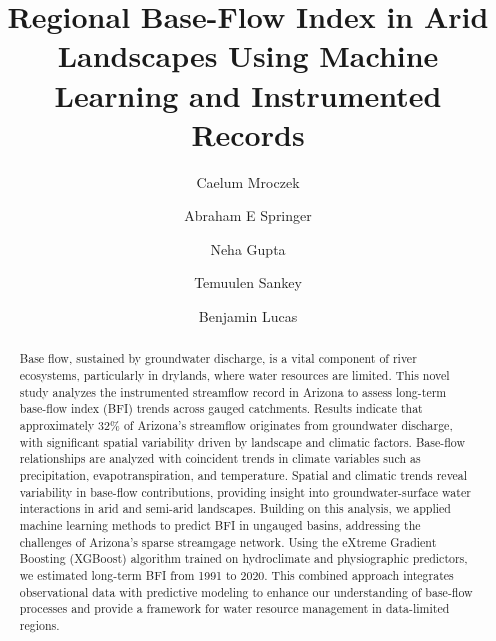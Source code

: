 \documentclass[
  authoryear,
  preprint,
  1p,
  onecolumn]{elsarticle}
\begin{document}
\begin{frontmatter}
\title{Regional Base-Flow Index in Arid Landscapes Using Machine
Learning and Instrumented Records}
\author[1]{Caelum Mroczek%
%
}
\author[1]{Abraham E Springer%
%
}

\author[2]{Neha Gupta%
%
}

\author[3]{Temuulen Sankey%
%
}

\author[4]{Benjamin Lucas%
%
}








        
\begin{abstract}
Base flow, sustained by groundwater discharge, is a vital component of
river ecosystems, particularly in drylands, where water resources are
limited. This novel study analyzes the instrumented streamflow record in
Arizona to assess long-term base-flow index (BFI) trends across gauged
catchments. Results indicate that approximately 32\% of Arizona's
streamflow originates from groundwater discharge, with significant
spatial variability driven by landscape and climatic factors. Base-flow
relationships are analyzed with coincident trends in climate variables
such as precipitation, evapotranspiration, and temperature. Spatial and
climatic trends reveal variability in base-flow contributions, providing
insight into groundwater-surface water interactions in arid and
semi-arid landscapes. Building on this analysis, we applied machine
learning methods to predict BFI in ungauged basins, addressing the
challenges of Arizona's sparse streamgage network. Using the eXtreme
Gradient Boosting (XGBoost) algorithm trained on hydroclimate and
physiographic predictors, we estimated long-term BFI from 1991 to 2020.
This combined approach integrates observational data with predictive
modeling to enhance our understanding of base-flow processes and provide
a framework for water resource management in data-limited regions.
\end{abstract}





\end{frontmatter}
    
\end{document}
